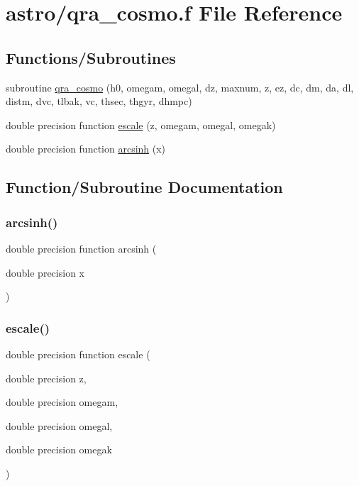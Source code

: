 \hypertarget{qra__cosmo_8f}{}\section{astro/qra\+\_\+cosmo.f File Reference}
\label{qra__cosmo_8f}
\subsection*{Functions/\+Subroutines}
\begin{DoxyCompactItemize}
\item 
subroutine \hyperlink{qra__cosmo_8f_a16198438d6f7834db63956669ef90b98}{qra\+\_\+cosmo} (h0, omegam, omegal, dz, maxnum, z, ez, dc, dm, da, dl, distm, dvc, tlbak, vc, thsec, thgyr, dhmpc)
\item 
double precision function \hyperlink{qra__cosmo_8f_a3e53be1185aaaad3554ed04fbbef258c}{escale} (z, omegam, omegal, omegak)
\item 
double precision function \hyperlink{qra__cosmo_8f_a18c24e5ac5e26f901edef7fd161d89fe}{arcsinh} (x)
\end{DoxyCompactItemize}


\subsection{Function/\+Subroutine Documentation}
\mbox{\label{qra__cosmo_8f_a18c24e5ac5e26f901edef7fd161d89fe}} 
\subsubsection{\texorpdfstring{arcsinh()}{arcsinh()}}
{\footnotesize\ttfamily double precision function arcsinh (\begin{DoxyParamCaption}\item[{double precision}]{x }\end{DoxyParamCaption})}

\mbox{\label{qra__cosmo_8f_a3e53be1185aaaad3554ed04fbbef258c}} 
\subsubsection{\texorpdfstring{escale()}{escale()}}
{\footnotesize\ttfamily double precision function escale (\begin{DoxyParamCaption}\item[{double precision}]{z,  }\item[{double precision}]{omegam,  }\item[{double precision}]{omegal,  }\item[{double precision}]{omegak }\end{DoxyParamCaption})}

